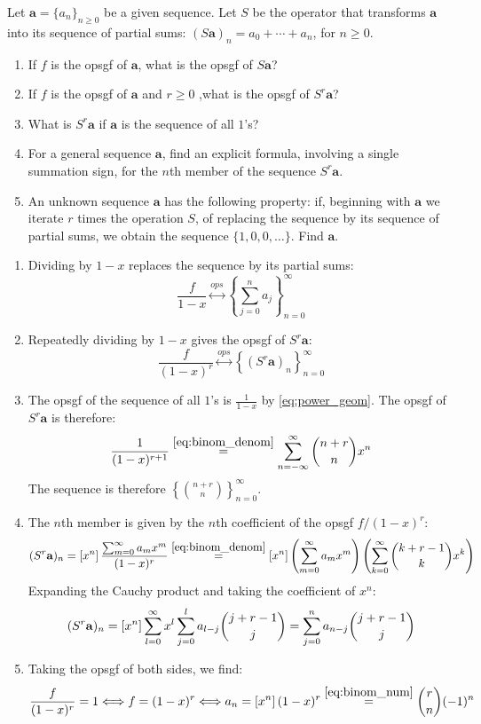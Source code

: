 \begin{exercise}
    Let $\mathbf{a} = \{a_n\}_{n\geq 0}$ be a given sequence. Let $S$ be the operator that transforms $\mathbf{a}$ into its sequence of partial sums: $(S\mathbf{a})_n = a_0 + \cdots + a_n$, for $n\geq 0$.
    \begin{enumerate}[label=(\alph*)]
        \item If $f$ is the opsgf of $\mathbf{a}$, what is the opsgf of $S\mathbf{a}$?
        \item If $f$ is the opsgf of $\mathbf{a}$ and $r\geq 0$ ,what is the opsgf of $S^r\mathbf{a}$?
        \item What is $S^r\mathbf{a}$ if $\mathbf{a}$ is the sequence of all $1$'s?
        \item For a general sequence $\mathbf{a}$, find an explicit formula, involving a single summation sign, for the $n$th member of the sequence $S^r\mathbf{a}$.
        \item An unknown sequence $\mathbf{a}$ has the following property: if, beginning with $\mathbf{a}$ we iterate $r$ times the operation $S$, of replacing the sequence by its sequence of partial sums, we obtain the sequence $\{1, 0, 0, \ldots\}$. Find $\mathbf{a}$.
    \end{enumerate}
\end{exercise}
\begin{solution}
    \begin{enumerate}[label=(\alph*)]
        \item Dividing by $1-x$ replaces the sequence by its partial sums:
        \[
            \frac{f}{1-x} \stackrel{ops}{\longleftrightarrow} \left\{ \sum_{j=0}^n a_j\right\}_{n=0}^\infty
        \]
        \item Repeatedly dividing by $1-x$ gives the opsgf of $S^r\mathbf{a}$:
        \[
            \frac{f}{(1-x)^r} \stackrel{ops}{\longleftrightarrow}  \left\{ (S^r\mathbf{a})_n\right\}_{n=0}^\infty
        \]
        \item The opsgf of the sequence of all $1$'s is $\frac{1}{1-x}$ by \eqref{eq:power_geom}. The opsgf of $S^r\mathbf{a}$ is therefore:
        \[
            \frac{1}{(1-x)^{r+1}} \estep{\eqref{eq:binom_denom}} \infsum \binom{n+r}{n}x^n
        \]
        The sequence is therefore $\left\{\binom{n+r}{n} \right\}_{n=0}^\infty$.
        \item The $n$th member is given by the $n$th coefficient of the opsgf $f/(1-x)^r$:
        \[
            (S^r\mathbf{a})_n = \coeff{x^n} \frac{\bsum[m] a_m x^m}{(1-x)^r}
            \estep{\eqref{eq:binom_denom}} \coeff{x^n} \left(\bsum[m] a_mx^m\right) \left(\bsum[k] \binom{k+r-1}{k}x^k \right)
        \]
        Expanding the Cauchy product and taking the coefficient of $x^n$:
        \[
            (S^r\mathbf{a})_n = \coeff{x^n} \bsum[l]  x^l\sum_{j=0}^l a_{l-j} \binom{j+r-1}{j}= \sum_{j=0}^n a_{n-j}\binom{j+r-1}{j}
        \]
        \item Taking the opsgf of both sides, we find:
        \[
            \frac{f}{(1-x)^r} = 1 \Longleftrightarrow   f = (1-x)^r \Longleftrightarrow  a_n = \coeff{x^n}(1-x)^r \estep{\eqref{eq:binom_num}} \binom{r}{n}(-1)^n
        \]
    \end{enumerate}
\end{solution}

